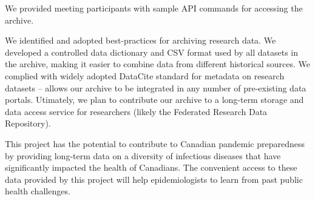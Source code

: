 \documentclass{article}
\begin{document}
We provided meeting participants with sample API commands for accessing the archive.

We identified and adopted best-practices for archiving research data. We developed a controlled data dictionary and CSV format used by all datasets in the archive, making it easier to combine data from different historical sources. We complied with widely adopted DataCite standard for metadata on research datasets -- allows our archive to be integrated in any number of pre-existing data portals. Utimately, we plan to contribute our archive to a long-term storage and data access service for researchers (likely the Federated Research Data Repository).

This project has the potential to contribute to Canadian pandemic preparedness by providing long-term data on a diversity of infectious diseases that have significantly impacted the health of Canadians. The convenient access to these data provided by this project will help epidemiologists to learn from past public health challenges.

%
%
%
\end{document}
